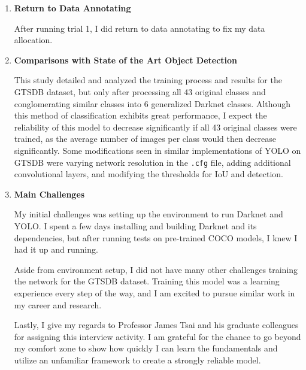 \documentclass{article}
\begin{document}
\begin{enumerate}
            \item \textbf{Return to Data Annotating}
            
            After running trial 1, I did return to data annotating to fix my data allocation. 
            
            \item \textbf{Comparisons with State of the Art Object Detection}
            
            This study detailed and analyzed the training process and results for the GTSDB dataset, but only after processing all 43 original classes and conglomerating similar classes into 6 generalized Darknet classes. Although this method of classification exhibits great performance, I expect the reliability of this model to decrease significantly if all 43 original classes were trained, as the average number of images per class would then decrease significantly. Some modifications seen in similar implementations of YOLO on GTSDB were varying network resolution in the \texttt{.cfg} file, adding additional convolutional layers, and modifying the thresholds for IoU and detection. 
            
            \item \textbf{Main Challenges}
            
            My initial challenges was setting up the environment to run Darknet and YOLO. I spent a few days installing and building Darknet and its dependencies, but after running tests on pre-trained COCO models, I knew I had it up and running.
            
            Aside from environment setup, I did not have many other challenges training the network for the GTSDB dataset. Training this model was a learning experience every step of the way, and I am excited to pursue similar work in my career and research. 
            
            Lastly, I give my regards to Professor James Tsai and his graduate colleagues for assigning this interview activity. I am grateful for the chance to go beyond my comfort zone to show how quickly I can learn the fundamentals and utilize an unfamiliar framework to create a strongly reliable model.
            
        \end{enumerate}


    \pagebreak
    
    
    
    
    
\end{document}
